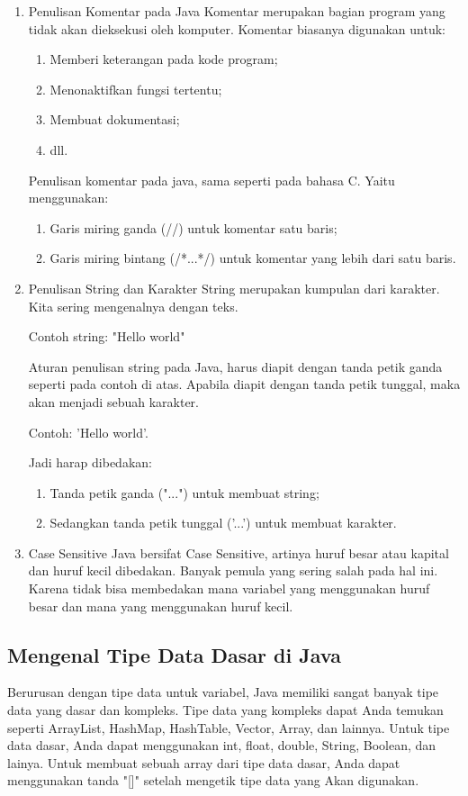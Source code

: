 \begin{enumerate}
\item Penulisan Komentar pada Java
Komentar merupakan bagian program yang tidak akan dieksekusi oleh komputer.
Komentar biasanya digunakan untuk:
\begin{enumerate}
    \item Memberi keterangan pada kode program;
    \item Menonaktifkan fungsi tertentu;
    \item Membuat dokumentasi;
    \item dll.
\end{enumerate}
Penulisan komentar pada java, sama seperti pada bahasa C. Yaitu menggunakan:
\begin{enumerate}
    \item Garis miring ganda (//) untuk komentar satu baris;
    \item Garis miring bintang (/*...*/) untuk komentar yang lebih dari satu baris.
\end{enumerate}

\item Penulisan String dan Karakter
String merupakan kumpulan dari karakter. Kita sering mengenalnya dengan teks.

Contoh string: "Hello world"

Aturan penulisan string pada Java, harus diapit dengan tanda petik ganda seperti pada contoh di atas. Apabila diapit dengan tanda petik tunggal, maka akan menjadi sebuah karakter.

Contoh: 'Hello world'.

Jadi harap dibedakan:
\begin{enumerate}
    \item Tanda petik ganda ("...") untuk membuat string;
    \item Sedangkan tanda petik tunggal ('...') untuk membuat karakter.
\end{enumerate}

\item Case Sensitive
Java bersifat Case Sensitive, artinya huruf besar atau kapital dan huruf kecil dibedakan. Banyak pemula yang sering salah pada hal ini. Karena tidak bisa membedakan mana variabel yang menggunakan huruf besar dan mana yang menggunakan huruf kecil.
\end{enumerate}


\subsection{Mengenal Tipe Data Dasar di Java}
Berurusan dengan tipe data untuk variabel, Java memiliki sangat banyak tipe data yang dasar dan kompleks. Tipe data yang kompleks dapat Anda temukan seperti ArrayList, HashMap, HashTable, Vector, Array, dan lainnya. Untuk tipe data dasar, Anda dapat menggunakan int, float, double, String, Boolean, dan lainya. Untuk membuat sebuah array dari tipe data dasar, Anda dapat menggunakan tanda "[]" setelah mengetik tipe data yang Akan digunakan.


